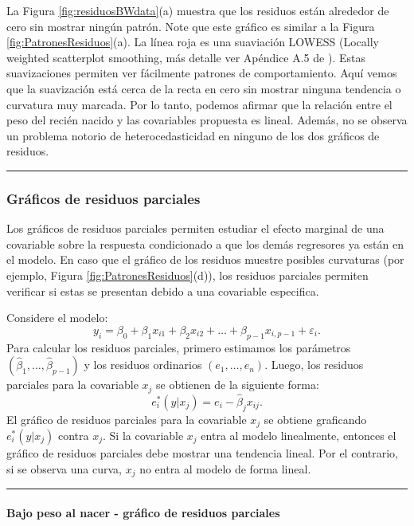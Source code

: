 \documentclass[
]{article}
\begin{document}
La Figura \ref{fig:residuosBWdata}(a) muestra que los residuos están alrededor de cero sin mostrar ningún patrón. Note que este gráfico es similar a la Figura \ref{fig:PatronesResiduos}(a). La línea roja es una suaviación LOWESS (Locally weighted scatterplot smoothing, más detalle ver Apéndice A.5 de \citet{weisberg_applied_2014}). Estas suavizaciones permiten ver fácilmente patrones de comportamiento. Aquí vemos que la suavización está cerca de la recta en cero sin mostrar ninguna tendencia o curvatura muy marcada. Por lo tanto, podemos afirmar que la relación entre el peso del recién nacido y las covariables propuesta es lineal. Además, no se observa un problema notorio de heterocedasticidad en ninguno de los dos gráficos de residuos.

\rule{\textwidth}{0.4pt}

\hypertarget{gruxe1ficos-de-residuos-parciales}{%
\subsubsection{Gráficos de residuos parciales}\label{gruxe1ficos-de-residuos-parciales}}

Los gráficos de residuos parciales permiten estudiar el efecto marginal de una covariable sobre la respuesta condicionado a que los demás regresores ya están en el modelo. En caso que el gráfico de los residuos muestre posibles curvaturas (por ejemplo, Figura \ref{fig:PatronesResiduos}(d)), los residuos parciales permiten verificar si estas se presentan debido a una covariable especifica.

Considere el modelo:
\[
y_{i} = \beta_{0} +\beta_{1}x_{i1}+\beta_{2}x_{i2} + \ldots + \beta_{p-1}x_{i,p-1} + \varepsilon_{i}.
\]
Para calcular los residuos parciales, primero estimamos los parámetros \((\widehat{\beta}_{1},\ldots,\widehat{\beta}_{p-1})\) y los residuos ordinarios \((e_{1},\ldots,e_{n})\). Luego, los residuos parciales para la covariable \(x_{j}\) se obtienen de la siguiente forma:
\[
e^{*}_{i}(y|x_{j}) = e_{i} - \widehat{\beta}_{j}x_{ij}.
\]
El gráfico de residuos parciales para la covariable \(x_{j}\) se obtiene graficando \(e^{*}_{i}(y|x_{j})\) contra \(x_{j}\). Si la covariable \(x_{j}\) entra al modelo linealmente, entonces el gráfico de residuos parciales debe mostrar una tendencia lineal. Por el contrario, si se observa una curva, \(x_{j}\) no entra al modelo de forma lineal.

\rule{\textwidth}{0.4pt}

\hypertarget{bajo-peso-al-nacer---gruxe1fico-de-residuos-parciales}{%
\paragraph*{Bajo peso al nacer - gráfico de residuos parciales}\label{bajo-peso-al-nacer---gruxe1fico-de-residuos-parciales}}
\end{document}
